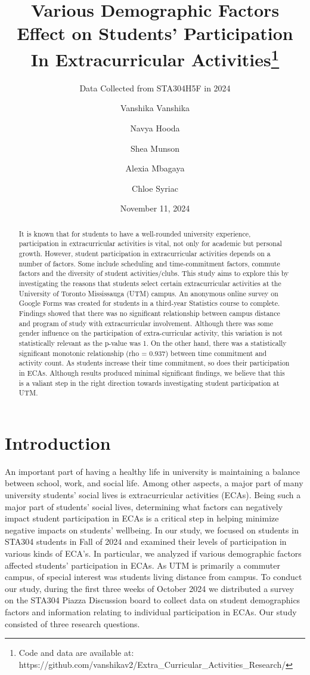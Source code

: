 \documentclass[
  letterpaper,
  DIV=11,
  numbers=noendperiod]{scrartcl}
\title{Various Demographic Factors Effect on Students' Participation In
Extracurricular Activities\thanks{Code and data are available at:
https://github.com/vanshikav2/Extra\_Curricular\_Activities\_Research/}}
\subtitle{Data Collected from STA304H5F in 2024}
\author{Vanshika Vanshika \and Navya Hooda \and Shea Munson \and Alexia
Mbagaya \and Chloe Syriac}
\date{November 11, 2024}
\renewcommand*\contentsname{Table of contents}
\newcommand\contentsname{Table of contents}
\begin{document}
\maketitle
\begin{abstract}
It is known that for students to have a well-rounded university
experience, participation in extracurricular activities is vital, not
only for academic but personal growth. However, student participation in
extracurricular activities depends on a number of factors. Some include
scheduling and time-commitment factors, commute factors and the
diversity of student activities/clubs. This study aims to explore this
by investigating the reasons that students select certain
extracurricular activities at the University of Toronto Mississauga
(UTM) campus. An anonymous online survey on Google Forms was created for
students in a third-year Statistics course to complete. Findings showed
that there was no significant relationship between campus distance and
program of study with extracurricular involvement. Although there was
some gender influence on the participation of extra-curricular activity,
this variation is not statistically relevant as the p-value was 1. On
the other hand, there was a statistically significant monotonic
relationship (rho = 0.937) between time commitment and activity count.
As students increase their time commitment, so does their participation
in ECAs. Although results produced minimal significant findings, we
believe that this is a valiant step in the right direction towards
investigating student participation at UTM.
\end{abstract}

\renewcommand*\contentsname{Table of contents}
{
\hypersetup{linkcolor=}
\setcounter{tocdepth}{3}
\tableofcontents
}
\section{Introduction}\label{introduction}

An important part of having a healthy life in university is maintaining
a balance between school, work, and social life. Among other aspects, a
major part of many university students' social lives is extracurricular
activities (ECAs). Being such a major part of students' social lives,
determining what factors can negatively impact student participation in
ECAs is a critical step in helping minimize negative impacts on
students' wellbeing. In our study, we focused on students in STA304
students in Fall of 2024 and examined their levels of participation in
various kinds of ECA's. In particular, we analyzed if various
demographic factors affected students' participation in ECAs. As UTM is
primarily a commuter campus, of special interest was students living
distance from campus. To conduct our study, during the first three weeks
of October 2024 we distributed a survey on the STA304 Piazza Discussion
board to collect data on student demographics factors and information
relating to individual participation in ECAs. Our study consisted of
three research questions.
\end{document}
